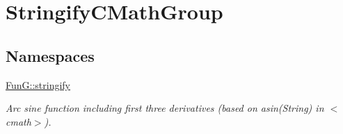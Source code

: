 \hypertarget{group__StringifyCMathGroup}{\section{Stringify\-C\-Math\-Group}
\label{group__StringifyCMathGroup}
}
\subsection*{Namespaces}
\begin{DoxyCompactItemize}
\item 
\hyperlink{namespaceFunG_1_1stringify}{Fun\-G\-::stringify}
\begin{DoxyCompactList}\small\item\em Arc sine function including first three derivatives (based on asin(\-String) in $<$cmath$>$). \end{DoxyCompactList}\end{DoxyCompactItemize}
